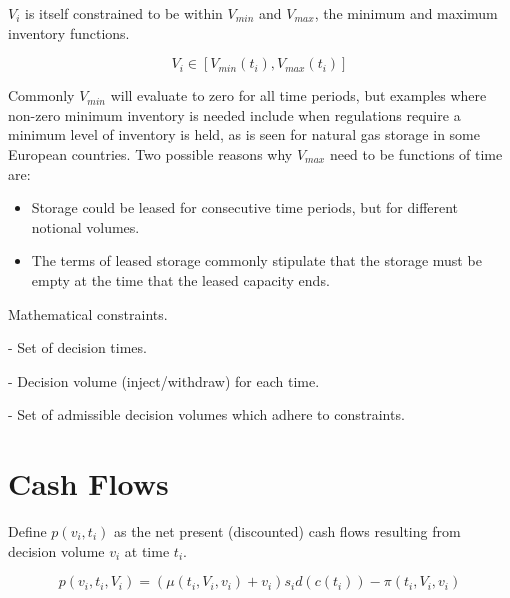\documentclass{article}
\begin{document}
\bigskip

$V_i$ is itself constrained to be within $V_{min}$ and $V_{max}$, the minimum and maximum
inventory functions.

\begin{equation}
    V_i \in [V_{min}(t_i), V_{max}(t_i)]
\end{equation}

Commonly $V_{min}$ will evaluate to zero for all time periods, but examples
where non-zero minimum inventory is needed include when regulations require a minimum
level of inventory is held, as is seen for natural gas storage in some European countries.
Two possible reasons why $V_{max}$ need to be functions of time are:
\begin{itemize}
    \item Storage could be leased for consecutive time periods, but for different notional
    volumes.
    \item The terms of leased storage commonly stipulate that the storage must be empty
    at the time that the leased capacity ends.
\end{itemize}


Mathematical constraints.

- Set of decision times.

- Decision volume (inject/withdraw) for each time.

- Set of admissible decision volumes which adhere to constraints.


\section{Cash Flows}
Define $p(v_i, t_i)$ as the net present (discounted) cash flows resulting from decision
volume $v_i$ at time $t_i$.

\begin{equation}
    p(v_i, t_i, V_i) = (\mu(t_i, V_i, v_i) + v_i) s_i d(c(t_i)) - \pi(t_i, V_i, v_i)
\end{equation}
\end{document}
